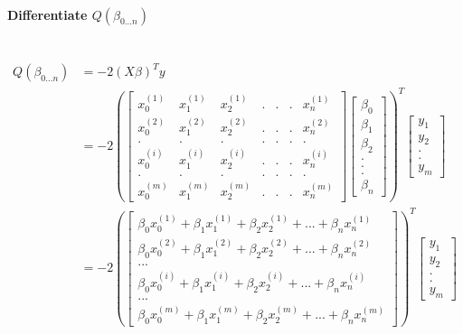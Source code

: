 \documentclass{article}
\begin{document}
	\paragraph{Differentiate $Q(\beta_{0...n})$}~\\
	\begin{align*}
	Q(\beta_{0...n})&=-2(X\beta)^Ty\\
	&=-2\left( \begin{bmatrix}
	x^{(1)}_0&x^{(1)}_1&x^{(1)}_2&.&.&.&x^{(1)}_n\\
	x^{(2)}_0&x^{(2)}_1&x^{(2)}_2&.&.&.&x^{(2)}_n\\
	.&.&.&.&.&.&.\\
	x^{(i)}_0&x^{(i)}_1&x^{(i)}_2&.&.&.&x^{(i)}_n\\
	.&.&.&.&.&.&.\\
	x^{(m)}_0&x^{(m)}_1&x^{(m)}_2&.&.&.&x^{(m)}_n
	\end{bmatrix}\begin{bmatrix}
	\beta_0\\\beta_1\\\beta_2\\.\\.\\.\\\beta_n
	\end{bmatrix}\right)^T\begin{bmatrix}
	y_1\\y_2\\.\\.\\y_m
	\end{bmatrix}\\
	&=-2\left(\begin{bmatrix}
	\beta_0x^{(1)}_0+\beta_1x^{(1)}_1+\beta_2x^{(1)}_2+...+\beta_nx^{(1)}_n\\
	\beta_0x^{(2)}_0+\beta_1x^{(2)}_1+\beta_2x^{(2)}_2+...+\beta_nx^{(2)}_n\\
	...\\
	\beta_0x^{(i)}_0+\beta_1x^{(i)}_1+\beta_2x^{(i)}_2+...+\beta_nx^{(i)}_n\\
	...\\
	\beta_0x^{(m)}_0+\beta_1x^{(m)}_1+\beta_2x^{(m)}_2+...+\beta_nx^{(m)}_n
	\end{bmatrix}\right)^T\begin{bmatrix}
	y_1\\y_2\\.\\.\\y_m
	\end{bmatrix}
	\end{align*}
	
\end{document}
